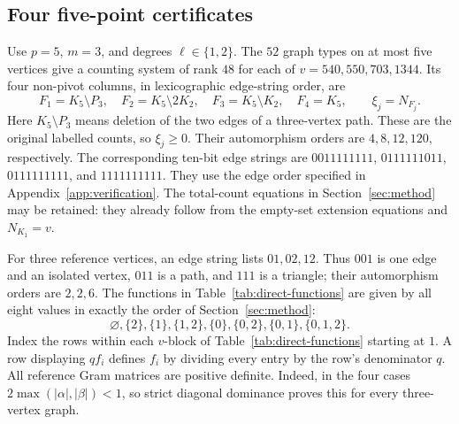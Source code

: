 \documentclass[11pt]{article}
\theoremstyle{remark}
\numberwithin{equation}{section}
\begin{document}
\subsection{Four five-point certificates}
Use $p=5$, $m=3$, and degrees $\ell\in\{1,2\}$.  The $52$ graph types
on at most five vertices give a counting system of rank $48$ for each
of $v=540,550,703,1344$.  Its four non-pivot columns, in lexicographic
edge-string order, are
\begin{equation}\label{eq:direct-free-types}
 F_1=K_5\setminus P_3,\quad F_2=K_5\setminus 2K_2,\quad
 F_3=K_5\setminus K_2,\quad F_4=K_5,
 \qquad \xi_j=N_{F_j}.
\end{equation}
Here $K_5\setminus P_3$ means deletion of the two edges of a
three-vertex path.  These are the original labelled counts, so
$\xi_j\ge0$.  Their automorphism orders are $4,8,12,120$, respectively.
The corresponding ten-bit edge strings are
$0011111111$, $0111111011$, $0111111111$, and $1111111111$.
They use the edge order specified in Appendix~\ref{app:verification}.
The total-count equations in Section~\ref{sec:method} may be retained: they already
follow from the empty-set extension equations and $N_{K_1}=v$.

For three reference vertices, an edge string lists $01,02,12$.
Thus $001$ is one edge and an isolated vertex, $011$ is a path, and
$111$ is a triangle; their automorphism orders are $2,2,6$.
The functions in Table~\ref{tab:direct-functions} are given by all eight
values in exactly the order of Section~\ref{sec:method}:
\[
 \varnothing,\{2\},\{1\},\{1,2\},\{0\},\{0,2\},\{0,1\},\{0,1,2\}.
\]
Index the rows within each $v$-block of Table~\ref{tab:direct-functions}
starting at $1$. A row displaying $qf_i$ defines $f_i$ by dividing
every entry by the row's denominator $q$.
All reference Gram matrices are positive definite.  Indeed, in the
four cases $2\max(|\alpha|,|\beta|)<1$, so strict diagonal dominance
proves this for every three-vertex graph.
\end{document}
